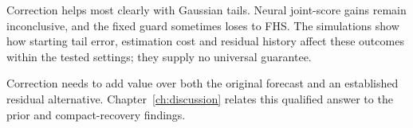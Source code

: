 Correction helps most clearly with Gaussian tails. Neural joint-score gains remain inconclusive, and the fixed guard sometimes loses to FHS. The simulations show how starting tail error, estimation cost and residual history affect these outcomes within the tested settings; they supply no universal guarantee.

Correction needs to add value over both the original forecast and an established residual alternative. Chapter~\ref{ch:discussion} relates this qualified answer to the prior and compact-recovery findings.